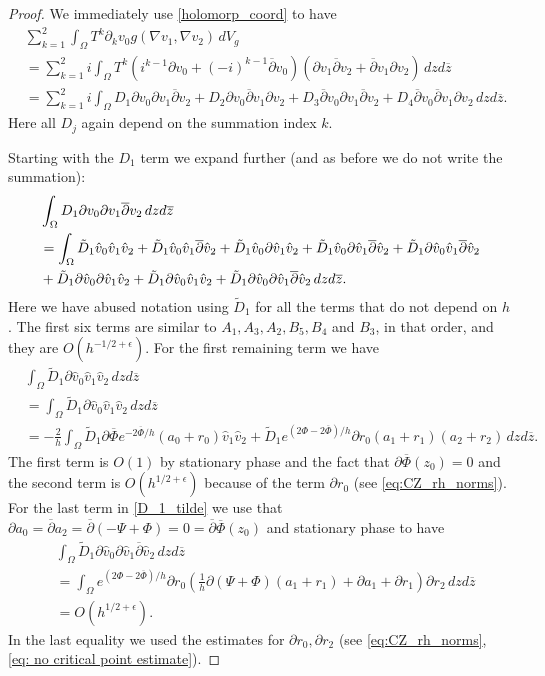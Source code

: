 \documentclass[a4paper, 10pt, twoside, notitlepage]{amsart}
\theoremstyle{plain}
\newcommand{\Om}{\Omega}
\numberwithin{equation}{section}
\newcommand {\p} {\partial}
\newcommand{\e}{\epsilon}
\newcommand{\dbar}{\ol{\p}}
\newcommand{\ol}[1]{\overline{#1}}
\newcommand{\oz}{\overline{z}}
\begin{document}
\begin{proof}
	We immediately use \eqref{holomorp_coord} to have
	\begin{align*}
		&\sum_{k=1}^{2} \int_{\Om} T^k\p_kv_0g(\nabla v_1, \nabla v_2)\,dV_g\\
		&= \sum_{k=1}^2 i \int_{\Om} T^k\left(i^{k-1}\p v_0 + (-i)^{k-1}\dbar v_0\right)\left(\p v_1 \dbar v_2 + \dbar v_1\p v_2\right)\,dzd\oz\\
		&= \sum_{k=1}^2 i \int_{\Om} D_1\p v_0 \p v_1\dbar v_2 + D_2\p v_0 \dbar v_1\p v_2 + D_3\dbar v_0 \p v_1\dbar v_2 + D_4\dbar v_0 \dbar v_1\p v_2\,dzd\oz.
	\end{align*}
	Here all $D_j$ again depend on the summation index $k$.
	
	Starting with the $D_1$ term we expand further (and as before we do not write the summation):
	\begin{align}\label{D_1_tilde}
		&\int_{\Om} D_1\p v_0 \p v_1\dbar v_2\,dzd\oz\\\notag
		&= \int_{\Om}\tilde D_1 \hat{v}_0\hat{v}_1\hat{v}_2 + \tilde D_1\hat{v}_0\hat{v}_1\dbar \hat{v}_2 + \tilde D_1\hat{v}_0\p \hat{v}_1 \hat{v}_2 + \tilde D_1\hat{v}_0\p \hat{v}_1\dbar \hat{v}_2 + \tilde D_1 \p \hat{v}_0\hat{v}_1\dbar \hat{v}_2 \\\notag
		&+ \tilde D_1\p \hat{v}_0\p \hat{v}_1 \hat{v}_2 + \tilde D_1 \p \hat{v}_0\hat{v}_1\hat{v}_2 + \tilde D_1\p \hat{v}_0 \p \hat{v}_1\dbar \hat{v}_2\,dzd\oz.
	\end{align}
	Here we have abused notation using $\tilde D_1$ for all the terms that do not depend on $h$. The first six terms are similar to $A_1, A_3, A_2, B_5, B_4$ and $B_3$, in that order, and they are $O(h^{-1/2+\e})$. For the first remaining term we have
	\begin{align*}
		&\int_{\Om}\tilde D_1 \p \hat{v}_0\hat{v}_1\hat{v}_2\,dzd\oz\\
		&= \int_{\Om}\tilde D_1 \p \hat{v}_0 \hat{v}_1\hat{v}_2\,dzd\oz\\
		&=-\frac{2}{h}\int_{\Om}\tilde D_1 \p\ol{\Phi} e^{-2\ol{\Phi}/h}(a_0+r_0)\hat{v}_1\hat{v}_2 + \tilde D_1e^{(2\Phi - 2\ol{\Phi})/h}\p r_0(a_1 + r_1)(a_2 + r_2)\,dzd\oz.
	\end{align*}
	The first term is $O(1)$ by stationary phase and the fact that $\p\ol{\Phi}(z_0)=0$ and the second term is $O(h^{1/2+\e})$ because of the term $\p r_0$ (see \eqref{eq:CZ_rh_norms}). For the last term in \eqref{D_1_tilde} we use that $\p a_0 =\dbar a_2 = \dbar(-\Psi + \Phi)=0=\dbar\ol{\Phi}(z_0)$ and stationary phase to have
	\begin{align*}
		&\int_{\Om}\tilde D_1\p \hat{v}_0\p \hat{v}_1\dbar \hat{v}_2\,dzd\oz\\
		&= \int_{\Om}e^{(2\Phi-2\ol{\Phi})/h}\p r_0\left(\frac{1}{h}\p(\Psi+\Phi)(a_1+r_1) + \p a_1 + \p r_1\right)\p r_2\,dzd\oz\\
		&= O(h^{1/2+\e}).
	\end{align*}
	In the last equality we used the estimates for $\p r_0, \p r_2$ (see \eqref{eq:CZ_rh_norms}, \eqref{eq: no critical point estimate}).
	

\end{proof}
\end{document}

